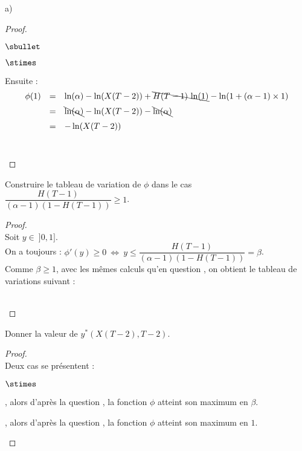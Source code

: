 \begin{noliste}{a)}
\begin{proof}
\begin{noliste}{$\sbullet$}
\begin{noliste}{$\stimes$}
	  \item Ensuite :
	  \[
	    \begin{array}{rcl}
	      \phi(1) &=& \ln(\alpha) - \ln(X(T-2)) + 
	      \bcancel{H(T-1) \, \ln(1)} - \ln(1+ (\alpha-1) \times 1)
	      \\[.2cm]
	      &=& \bcancel{\ln(\alpha)} - \ln(X(T-2)) - 
	      \bcancel{\ln(\alpha)}
	      \\[.2cm]
	      &=& - \ln(X(T-2))
	    \end{array}
	  \]~\\[-1.8cm]
	\end{noliste}
      \end{noliste}
    \end{proof}
    
    \item Construire le tableau de variation de $\phi$ dans le cas 
    $\dfrac{H(T-1)}{(\alpha-1)(1-H(T-1))} \geq 1$.
    
    \begin{proof}~\\
      Soit $y \in \ ]0,1]$.\\
      On a toujours : $\phi'(y) \geq 0 \ \Leftrightarrow \
      y \leq \dfrac{H(T-1)}{(\alpha -1) (1- H(T-1))} = \beta$.\\[.1cm]
      Comme $\beta \geq 1$, avec les mêmes calculs qu'en 
      question , on obtient le tableau de variations 
      suivant :
      \begin{center}
      \end{center}~\\[-1.4cm]
    \end{proof}

    
    \item Donner la valeur de $y^*(X(T-2),T-2)$.
    
    \begin{proof}~\\
      Deux cas se présentent :
      \begin{noliste}{$\stimes$}
	\item {}, alors d'après la 
	question , la fonction $\phi$ atteint son 
	maximum en $\beta$.
	
	\item {}, alors d'après la 
	question , la fonction $\phi$ atteint son 
	maximum en $1$.
	~\\[-1.2cm]
      \end{noliste}
    \end{proof}
  \end{noliste}





